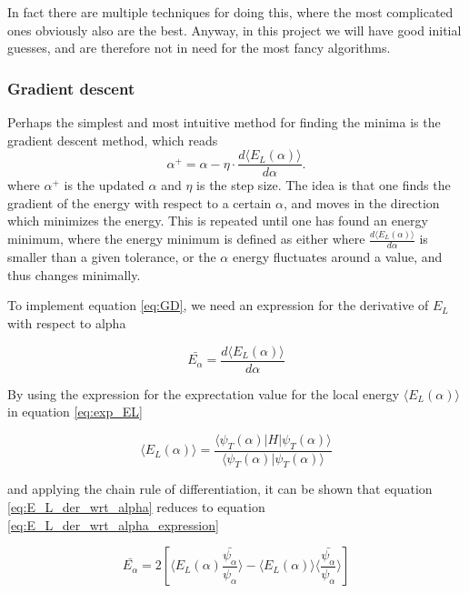 \documentclass[norsk,a4paper,12pt]{article}
\begin{document}
In fact there are multiple techniques for doing this, where the most complicated ones obviously also are the best. Anyway, in this project we will have good initial guesses, and are therefore not in need for the most fancy algorithms. 

\subsubsection{Gradient descent}
Perhaps the simplest and most intuitive method for finding the minima is the gradient descent method, which reads
\begin{equation}
\label{eq:GD}
\alpha^+=\alpha - \eta\cdot\frac{d\langle E_L(\alpha)\rangle}{d\alpha}.
\end{equation}
where $\alpha^+$ is the updated $\alpha$ and $\eta$ is the step size. The idea is that one finds the gradient of the energy with respect to a certain $\alpha$, and moves in the direction which minimizes the energy. This is repeated until one has found an energy minimum, where the energy minimum is defined as either where $\frac{d\langle E_L(\alpha)\rangle}{d\alpha}$ is smaller than a given tolerance, or the $\alpha$ energy fluctuates around a value, and thus changes minimally.
\par 
\vspace{3mm}

To implement equation \ref{eq:GD}, we need an expression for the derivative of $E_L$ with respect to alpha

\begin{equation}
	\label{eq:E_L_der_wrt_alpha}
	\bar{E_{\alpha}} = \frac{d \langle E_L (\alpha) \rangle}{d \alpha}
\end{equation}

By using the expression for the exprectation value for the local energy $ \langle E_L (\alpha) \rangle$ in equation \ref{eq:exp_EL} 

\begin{equation}
	\label{eq:exp_EL}
	\langle E_L (\alpha) \rangle = \frac{ \langle \psi_T(\alpha) | H | \psi_T(\alpha)  \rangle}{ \langle \psi_T(\alpha)  |  \psi_T(\alpha)  \rangle }
\end{equation}

and applying the chain rule of differentiation, it can be shown that equation \ref{eq:E_L_der_wrt_alpha} reduces to equation \ref{eq:E_L_der_wrt_alpha_expression}

\begin{equation}
	\label{eq:E_L_der_wrt_alpha_expression}
	\bar{E_{\alpha}} = 2 [\langle E_L (\alpha)  \frac{ \bar{\psi_{\alpha}}}{\psi_{\alpha}}\rangle - \langle E_L (\alpha) \rangle \langle \frac{\bar{\psi_{\alpha}}}{\psi_{\alpha}} \rangle ]
\end{equation}
\end{document}
